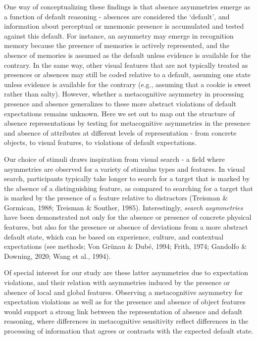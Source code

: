 \documentclass[12pt,twoside]{reedthesis}
\begin{document}
One way of conceptualizing these findings is that absence asymmetries emerge as a function of default reasoning - absences are considered the `default', and information about perceptual or mnemonic presence is accumulated and tested against this default. For instance, an asymmetry may emerge in recognition memory because the presence of memories is actively represented, and the absence of memories is assumed as the default unless evidence is available for the contrary. In the same way, other visual features that are not typically treated as presences or absences may still be coded relative to a default, assuming one state unless evidence is available for the contrary (e.g., assuming that a cookie is sweet rather than salty). However, whether a metacognitive asymmetry in processing presence and absence generalizes to these more abstract violations of default expectations remains unknown. Here we set out to map out the structure of absence representations by testing for metacognitive asymmetries in the presence and absence of attributes at different levels of representation - from concrete objects, to visual features, to violations of default expectations.

Our choice of stimuli draws inspiration from visual search - a field where asymmetries are observed for a variety of stimulus types and features. In visual search, participants typically take longer to search for a target that is marked by the absence of a distinguishing feature, as compared to searching for a target that is marked by the presence of a feature relative to distractors (Treisman \& Gormican, 1988; Treisman \& Souther, 1985). Interestingly, \emph{search asymmetries} have been demonstrated not only for the absence or presence of concrete physical features, but also for the presence or absence of deviations from a more abstract default state, which can be based on experience, culture, and contextual expectations (see methods; Von Grünau \& Dubé, 1994; Frith, 1974; Gandolfo \& Downing, 2020; Wang et al., 1994).

Of special interest for our study are these latter asymmetries due to expectation violations, and their relation with asymmetries induced by the presence or absence of local and global features. Observing a metacognitive asymmetry for expectation violations as well as for the presence and absence of object features would support a strong link between the representation of absence and default reasoning, where differences in metacognitive sensitivity reflect differences in the processing of information that agrees or contrasts with the expected default state.
\end{document}

